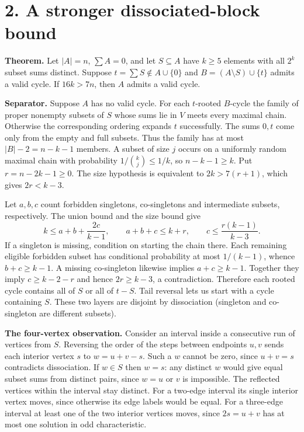 \documentclass[11pt]{article}
\begin{document}
\section*{2. A stronger dissociated-block bound}
\textbf{Theorem.} Let $|A|=n$, $\sum A=0$, and let $S\subseteq A$ have $k\ge5$ elements with all $2^k$ subset sums distinct. Suppose $t=\sum S\notin A\cup\{0\}$ and $B=(A\setminus S)\cup\{t\}$ admits a valid cycle. If $16k>7n$, then $A$ admits a valid cycle.

\textbf{Separator.} Suppose $A$ has no valid cycle. For each $t$-rooted $B$-cycle the family of proper nonempty subsets of $S$ whose sums lie in $V$ meets every maximal chain. Otherwise the corresponding ordering expands $t$ successfully. The sums $0,t$ come only from the empty and full subsets. Thus the family has at most $|B|-2=n-k-1$ members. A subset of size $j$ occurs on a uniformly random maximal chain with probability $1/\binom{k}{j}\le1/k$, so $n-k-1\ge k$. Put $r=n-2k-1\ge0$. The size hypothesis is equivalent to $2k>7(r+1)$, which gives $2r<k-3$.

Let $a,b,c$ count forbidden singletons, co-singletons and intermediate subsets, respectively. The union bound and the size bound give
\[
 k\le a+b+\frac{2c}{k-1},\qquad
 a+b+c\le k+r,\qquad c\le\frac{r(k-1)}{k-3}.
\]
If a singleton is missing, condition on starting the chain there. Each remaining eligible forbidden subset has conditional probability at most $1/(k-1)$, whence $b+c\ge k-1$. A missing co-singleton likewise implies $a+c\ge k-1$. Together they imply $c\ge k-2-r$ and hence $2r\ge k-3$, a contradiction. Therefore each rooted cycle contains all of $S$ or all of $t-S$. Tail reversal lets us start with a cycle containing $S$. These two layers are disjoint by dissociation (singleton and co-singleton are different subsets).

\textbf{The four-vertex observation.} Consider an interval inside a consecutive run of vertices from $S$. Reversing the order of the steps between endpoints $u,v$ sends each interior vertex $s$ to $w=u+v-s$. Such a $w$ cannot be zero, since $u+v=s$ contradicts dissociation. If $w\in S$ then $w=s$: any distinct $w$ would give equal subset sums from distinct pairs, since $w=u$ or $v$ is impossible. The reflected vertices within the interval stay distinct. For a two-edge interval its single interior vertex moves, since otherwise its edge labels would be equal. For a three-edge interval at least one of the two interior vertices moves, since $2s=u+v$ has at most one solution in odd characteristic.
\end{document}
